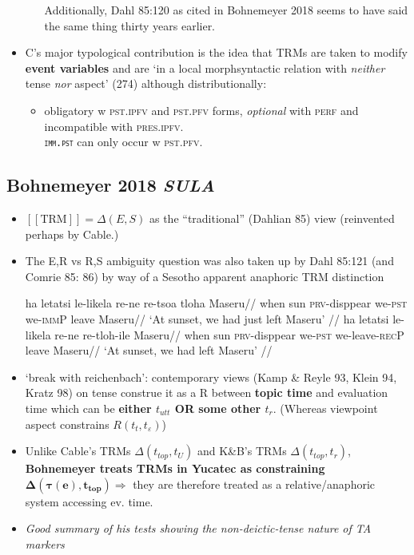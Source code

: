 \documentclass[10pt]{article}
\newcommand{\denote}[1]{\mbox{$[\![\mbox{#1}]\!]$}}
\begin{document}
\begin{itemize}
\begin{itemize}
	Additionally, Dahl 85:120 as cited in Bohnemeyer 2018 seems to have said the same thing thirty years earlier.
		\end{itemize}
	\item C's major typological contribution is the idea that TRMs are taken to modify \textbf{event variables }and are `in a local morphsyntactic relation with \textit{neither} tense \textit{nor} aspect' (274) although distributionally:
	\begin{itemize}
		\item obligatory w \textsc{pst.ipfv} and \textsc{pst.pfv} forms, \textit{optional} with \textsc{perf} and incompatible with \textsc{pres.ipfv}.\\\texttt{\textsc{imm.pst}} can only occur w \textsc{pst.pfv}.

\end{itemize}
\end{itemize}


\subsection{Bohnemeyer 2018 \textit{SULA}}
\begin{itemize}
	\item \denote{TRM}$=\Delta(E,S)$ as the ``traditional'' (Dahlian 85) view (reinvented perhaps by Cable.)
	\item The E,R vs R,S ambiguity question was also taken up by Dahl 85:121 (and Comrie 85: 86) by way of a Sesotho apparent anaphoric TRM distinction
	
	\pex\a\begingl\gla ha letatsi le-likela re-ne re-tsoa tloha Maseru//
	\glb when sun \textsc{prv}-disppear we-\textsc{pst} we-\textsc{immP} leave Maseru//
	\glft`At sunset, we had just left Maseru' //\endgl
	\a\begingl\gla ha letatsi le-likela re-ne re-tloh-ile Maseru//
	\glb when sun \textsc{prv}-disppear we-\textsc{pst} we-leave-\textsc{recP} leave Maseru//
	\glft `At sunset, we had left Maseru' //\endgl\xe
	
	\item `break with reichenbach': contemporary views (Kamp \& Reyle 93, Klein 94, Kratz 98) on tense construe it as a R between \textbf{topic time} and evaluation time which can be \textbf{either $t_{utt}$ OR some other $t_r$}. (Whereas viewpoint aspect constrains $R(t_t,t_\varepsilon)$)
	
	
	\item Unlike Cable's TRMs $\Delta(t_{top},t_U)$ and K\&B's TRMs $\Delta(t_{top},t_r)$, \textbf{Bohnemeyer treats TRMs in Yucatec as constraining} $\boldsymbol{\Delta(\tau(e),t_{top})}\Rightarrow$ they are therefore treated as a relative/anaphoric system accessing ev. time.
	
	
	\item \textit{Good summary of his tests showing the non-deictic-tense nature of TA markers}
\end{itemize}
\end{document}
